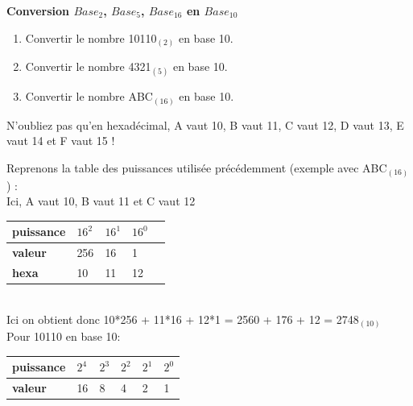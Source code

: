 \begin{Exercice}[15 minutes] \textbf{Conversion $Base_{2}$, $Base_{5}$, $Base_{16}$ en $Base_{10}$}
    \begin{enumerate}
        \item Convertir le nombre 10110$_{(2)}$ en base 10.
        \item Convertir le nombre 4321$_{(5)}$ en base 10.
        \item Convertir le nombre ABC$_{(16)}$ en base 10.
    \end{enumerate}
    \begin{conseil}
        
         N'oubliez pas qu'en hexadécimal, A vaut 10, B vaut 11, C vaut 12, D vaut 13, E vaut 14 et F vaut 15 ! \\
    \end{conseil}
    \begin{solution}
        Reprenons la table des puissances utilisée précédemment (exemple avec ABC$_{(16)}$) : \\
        
        Ici, A vaut 10, B vaut 11 et C vaut 12 \\
        
        \begin{tabular}{| C{0.1\textwidth} | C{0.1\textwidth} | C{0.1\textwidth} | C{0.1\textwidth} | C{0.1\textwidth} |} 
            \hline
            \textbf{puissance} & $16^{2}$ & $16^{1}$ & $16^{0}$ \\ [0.5ex] 
            \hline
            \textbf{valeur} & 256 & 16 & 1 \\ [0.5ex] 
            \hline
            \textbf{hexa} & 10 & 11 & 12 \\ [0.5ex] 
            \hline
        \end{tabular} \\
        
        Ici on obtient donc 10*256 + 11*16 + 12*1 = 2560 + 176 + 12 = 2748$_{(10)}$ \\

        Pour 10110 en base 10: \\
        
        \begin{tabular}{| C{0.1\textwidth} | C{0.1\textwidth} | C{0.1\textwidth} | C{0.1\textwidth} | C{0.1\textwidth} | C{0.1\textwidth} |} 
            \hline
            \textbf{puissance} & $2^{4}$ & $2^{3}$ & $2^{2}$ & $2^{1}$ & $2^{0}$ \\ [0.5ex] 
            \hline
            \textbf{valeur} & 16 & 8 & 4 & 2 & 1 \\ [0.5ex] 
            \hline
        \end{tabular} \\
        

\end{solution}
\end{Exercice}
